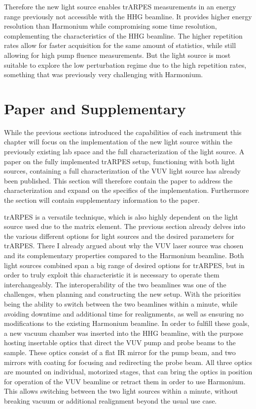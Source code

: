 Therefore the new light source enables trARPES measurements in an energy range previously not accessible with the HHG beamline.
It provides higher energy resolution than Harmonium while compromising some time resolution, complementing the characteristics of the HHG beamline.
The higher repetition rates allow for faster acquisition for the same amount of statistics, while still allowing for high pump fluence measurements.
But the light source is most suitable to explore the low perturbation regime due to the high repetition rates, something that was previously very challenging with Harmonium.

\section{Paper and Supplementary}

While the previous sections introduced the capabilities of each instrument this chapter will focus on the implementation of the new light source within the previously existing lab space and the full characterization of the light source.
A paper on the fully implemented trARPES setup, functioning with both light sources, containing a full characterization of the VUV light source has already been published.
This section will therefore contain the paper to address the characterization and expand on the specifics of the implementation.
Furthermore the section will contain supplementary information to the paper.

trARPES is a versatile technique, which is also highly dependent on the light source used due to the matrix element.
The previous section already delves into the various different options for light sources and the desired parameters for trARPES.
There I already argued about why the VUV laser source was chosen and its complementary properties compared to the Harmonium beamline.
Both light sources combined span a big range of desired options for trARPES, but in order to truly exploit this characteristic it is necessary to operate them interchangeably. 
The interoperability of the two beamlines was one of the challenges, when planning and constructing the new setup.
With the priorities being the ability to switch between the two beamlines within a minute, while avoiding downtime and additional time for realignments, as well as ensuring no modifications to the existing Harmonium beamline.
In order to fulfill these goals, a new vacuum chamber was inserted into the HHG beamline, with the purpose hosting insertable optics that direct the VUV pump and probe beams to the sample.
These optics consist of a flat IR mirror for the pump beam, and two  mirrors with  coating for focusing and redirecting the probe beam.
All three optics are mounted on individual, motorized stages, that can bring the optics in position for operation of the VUV beamline or retract them in order to use Harmonium.
This allows switching between the two light sources within a minute, without breaking vacuum or additional realignment beyond the usual use case.

